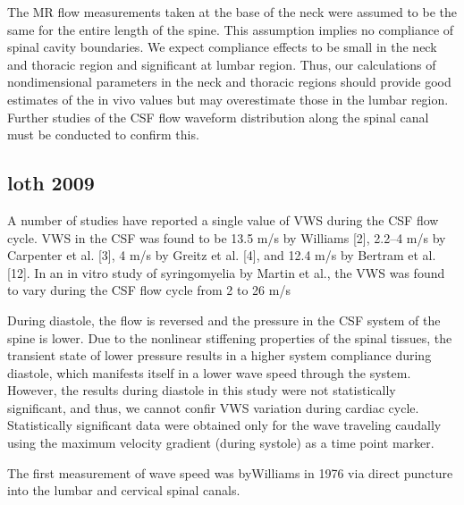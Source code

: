 \documentclass{report}
\begin{document}
The MR flow measurements taken at the base of the neck were
assumed to be the same for the entire length of the spine. This
assumption implies no compliance of spinal cavity boundaries.
We expect compliance effects to be small in the neck and thoracic
region and significant at lumbar region. Thus, our calculations of
nondimensional parameters in the neck and thoracic regions
should provide good estimates of the in vivo values but may overestimate
those in the lumbar region. Further studies of the CSF
flow waveform distribution along the spinal canal must be conducted
to confirm this.


\subsection{loth 2009}

A number of studies have reported a single value of VWS during
the CSF flow cycle. VWS in the CSF was found to be 13.5 m/s
by Williams [2], 2.2–4 m/s by Carpenter et al. [3], 4 m/s by Greitz
et al. [4], and 12.4 m/s by Bertram et al. [12]. In an in vitro study of
syringomyelia by Martin et al., the VWS was found to vary during the
CSF flow cycle from 2 to 26 m/s

During diastole, the flow is reversed and the pressure in the CSF system
of the spine is lower. Due to the nonlinear stiffening properties of the
spinal tissues, the transient state of lower pressure results in a higher
system compliance during diastole, which manifests itself in a lower
wave speed through the system. However, the results during diastole in
this study were not statistically significant, and thus, we cannot confir
VWS variation during cardiac cycle. Statistically significant data were
obtained only for the wave traveling caudally using the maximum
velocity gradient (during systole) as a time point marker.

The first measurement of wave
speed was byWilliams in 1976 via direct puncture into the lumbar and
cervical spinal canals.
\end{document}
